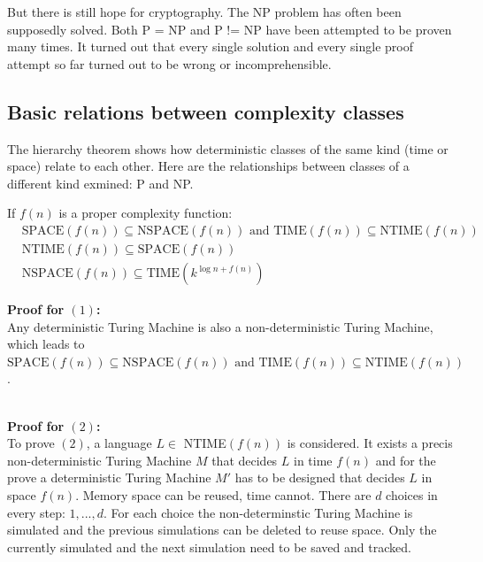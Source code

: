 \documentclass[a4]{scrartcl}
\begin{document}
But there is still hope for cryptography. The NP problem has often been supposedly solved. Both P = NP and P != NP have been attempted to be proven many times. It turned out that every single solution and every single proof attempt so far turned out to be wrong or incomprehensible. \cite{DD, book, GTI}






\subsection*{Basic relations between complexity classes}


The hierarchy theorem shows how deterministic classes of the same kind (time or space) relate to each other.
Here are the relationships between classes of a different kind exmined: P and NP.

If $f(n)$ is a proper complexity function:
\begin{align}
& \text{SPACE}(f(n)) \subseteq \text{NSPACE}(f(n)) \text{ and TIME}(f(n)) \subseteq \text{NTIME}(f(n)) \\
& \text{NTIME}(f(n)) \subseteq \text{SPACE}(f(n)) \\
& \text{NSPACE}(f(n)) \subseteq \text{TIME}(k^{\log n + f(n)}) 
\end{align}

\textbf{Proof for $(1)$:} \\
Any deterministic Turing Machine is also a non-deterministic Turing Machine, which leads to $\text{SPACE}(f(n)) \subseteq \text{NSPACE}(f(n)) \text{ and TIME}(f(n)) \subseteq \text{NTIME}(f(n))$.

\ \\
\textbf{Proof for $(2)$:} \\
To prove $(2)$, a language $L \in $ NTIME$(f(n))$ is considered. It exists a precis non-deterministic Turing Machine $M$ that decides $L$ in time $f(n)$ and for the prove a deterministic Turing Machine $M'$ has to be designed that decides $L$ in space $f(n)$.
Memory space can be reused, time cannot.
There are $d$ choices in every step: $1,...,d$. For each choice the non-determinstic Turing Machine is simulated and the previous simulations can be deleted to reuse space. Only the currently simulated and the next simulation need to be saved and tracked.


\ \\
\end{document}
